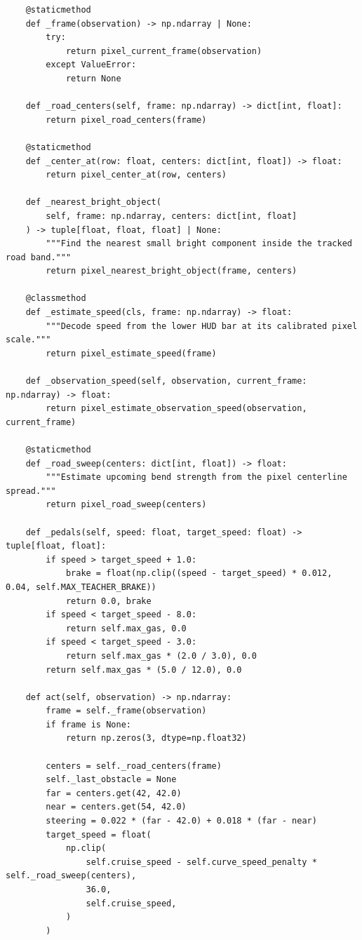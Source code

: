 \documentclass[11pt,a4paper]{article}
\begin{document}
\begin{lstlisting}
    @staticmethod
    def _frame(observation) -> np.ndarray | None:
        try:
            return pixel_current_frame(observation)
        except ValueError:
            return None

    def _road_centers(self, frame: np.ndarray) -> dict[int, float]:
        return pixel_road_centers(frame)

    @staticmethod
    def _center_at(row: float, centers: dict[int, float]) -> float:
        return pixel_center_at(row, centers)

    def _nearest_bright_object(
        self, frame: np.ndarray, centers: dict[int, float]
    ) -> tuple[float, float, float] | None:
        """Find the nearest small bright component inside the tracked road band."""
        return pixel_nearest_bright_object(frame, centers)

    @classmethod
    def _estimate_speed(cls, frame: np.ndarray) -> float:
        """Decode speed from the lower HUD bar at its calibrated pixel scale."""
        return pixel_estimate_speed(frame)

    def _observation_speed(self, observation, current_frame: np.ndarray) -> float:
        return pixel_estimate_observation_speed(observation, current_frame)

    @staticmethod
    def _road_sweep(centers: dict[int, float]) -> float:
        """Estimate upcoming bend strength from the pixel centerline spread."""
        return pixel_road_sweep(centers)

    def _pedals(self, speed: float, target_speed: float) -> tuple[float, float]:
        if speed > target_speed + 1.0:
            brake = float(np.clip((speed - target_speed) * 0.012, 0.04, self.MAX_TEACHER_BRAKE))
            return 0.0, brake
        if speed < target_speed - 8.0:
            return self.max_gas, 0.0
        if speed < target_speed - 3.0:
            return self.max_gas * (2.0 / 3.0), 0.0
        return self.max_gas * (5.0 / 12.0), 0.0

    def act(self, observation) -> np.ndarray:
        frame = self._frame(observation)
        if frame is None:
            return np.zeros(3, dtype=np.float32)

        centers = self._road_centers(frame)
        self._last_obstacle = None
        far = centers.get(42, 42.0)
        near = centers.get(54, 42.0)
        steering = 0.022 * (far - 42.0) + 0.018 * (far - near)
        target_speed = float(
            np.clip(
                self.cruise_speed - self.curve_speed_penalty * self._road_sweep(centers),
                36.0,
                self.cruise_speed,
            )
        )


\end{lstlisting}
\end{document}
